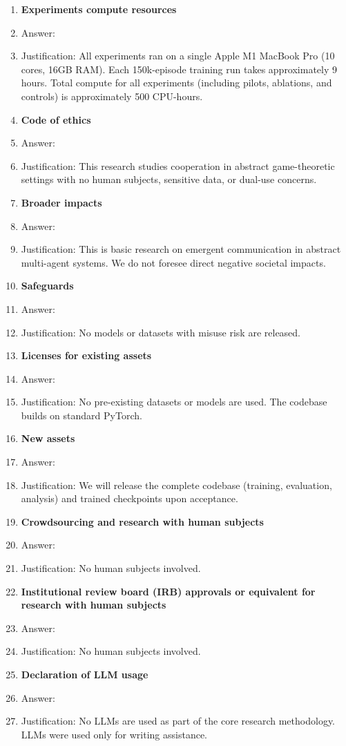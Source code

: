 \documentclass[
  10pt,
  letterpaper,
]{article}
\begin{document}
\begin{enumerate}
\item {\bf Experiments compute resources}
    \item[] Answer: \answerYes{}
    \item[] Justification: All experiments ran on a single Apple M1 MacBook Pro (10 cores, 16GB RAM). Each 150k-episode training run takes approximately 9 hours. Total compute for all experiments (including pilots, ablations, and controls) is approximately 500 CPU-hours.

\item {\bf Code of ethics}
    \item[] Answer: \answerYes{}
    \item[] Justification: This research studies cooperation in abstract game-theoretic settings with no human subjects, sensitive data, or dual-use concerns.

\item {\bf Broader impacts}
    \item[] Answer: \answerNA{}
    \item[] Justification: This is basic research on emergent communication in abstract multi-agent systems. We do not foresee direct negative societal impacts.

\item {\bf Safeguards}
    \item[] Answer: \answerNA{}
    \item[] Justification: No models or datasets with misuse risk are released.

\item {\bf Licenses for existing assets}
    \item[] Answer: \answerNA{}
    \item[] Justification: No pre-existing datasets or models are used. The codebase builds on standard PyTorch.

\item {\bf New assets}
    \item[] Answer: \answerYes{}
    \item[] Justification: We will release the complete codebase (training, evaluation, analysis) and trained checkpoints upon acceptance.

\item {\bf Crowdsourcing and research with human subjects}
    \item[] Answer: \answerNA{}
    \item[] Justification: No human subjects involved.

\item {\bf Institutional review board (IRB) approvals or equivalent for research with human subjects}
    \item[] Answer: \answerNA{}
    \item[] Justification: No human subjects involved.

\item {\bf Declaration of LLM usage}
    \item[] Answer: \answerNA{}
    \item[] Justification: No LLMs are used as part of the core research methodology. LLMs were used only for writing assistance.

\end{enumerate}
\end{document}

